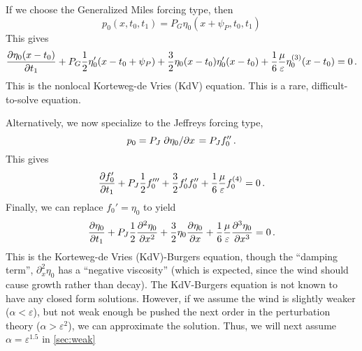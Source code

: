 \documentclass{jfm}
\renewcommand*{\epsilon}{\varepsilon}
\begin{document}
If we choose the Generalized Miles forcing type, then
\[
  p_0(x,t_0,t_1) = P_G \eta_0(x+\psi_P,t_0,t_1)
\]
This gives
\begin{equation}
  \pdv{\eta_0(x-t_0)}{t_1} + P_G \frac{1}{2} \eta_0'(x-t_0+\psi_P) +
  \frac{3}{2} \eta_0(x-t_0) \eta_0'(x-t_0) + \frac{1}{6}
  \frac{\mu}{\epsilon} \eta_0^{(3)}(x-t_0) = 0 \,.
  \label{eq:kdv_burgers_gen}
\end{equation}
This is the nonlocal Korteweg-de Vries (KdV) equation.
This is a rare, difficult-to-solve equation.

Alternatively, we now specialize to the Jeffreys forcing type,
\begin{equation}
  p_0 = P_J \pdv*{\eta_0}{x} = P_J f_0'' \,.
\end{equation}
This gives
\begin{equation}
   \pdv{f_0'}{t_1} + P_J \frac{1}{2} f_0''' + \frac{3}{2} f_0' f_0'' +
   \frac{1}{6} \frac{\mu}{\epsilon} f_0^{(4)} = 0 \,.
\end{equation}
Finally, we can replace $f_0' = \eta_0$ to yield
\begin{equation}
  \pdv{\eta_0}{t_1} + P_J \frac{1}{2} \pdv[2]{\eta_0}{x} + \frac{3}{2}
    \eta_0 \pdv{\eta_0}{x} + \frac{1}{6} \frac{\mu}{\epsilon}
    \pdv[3]{\eta_0}{x} = 0 \,.
  \label{eq:kdv_burgers}
\end{equation}
This is the Korteweg-de Vries (KdV)-Burgers equation, though the
``damping term'', $\partial^2_x \eta_0$ has a ``negative viscosity''
(which is expected, since the wind should cause growth rather than
decay).
The KdV-Burgers equation is not known to have any closed form solutions.
However, if we assume the wind is slightly weaker ($\alpha < \epsilon$),
but not weak enough be pushed the next order in the perturbation theory
($\alpha > \epsilon^2$), we can approximate the solution.
Thus, we will next assume $\alpha = \epsilon^{1.5}$ in \cref{sec:weak}
\end{document}
